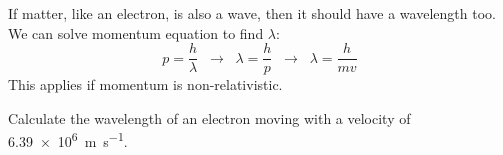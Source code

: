 If matter, like an electron, is also a wave, then it should have a wavelength
too. We can solve momentum equation to find $\lambda$:
\begin{equation}
    p=\frac h\lambda\;\;\rightarrow\;\;
    \lambda=\frac hp\;\;\rightarrow\;\;\boxed{\lambda=\frac h{mv}}
\end{equation}
This applies if momentum is non-relativistic.





\begin{example}
  Calculate the wavelength of an electron moving with a velocity of
  \SI{6.39e6}{\metre\per\second}.
\end{example}





